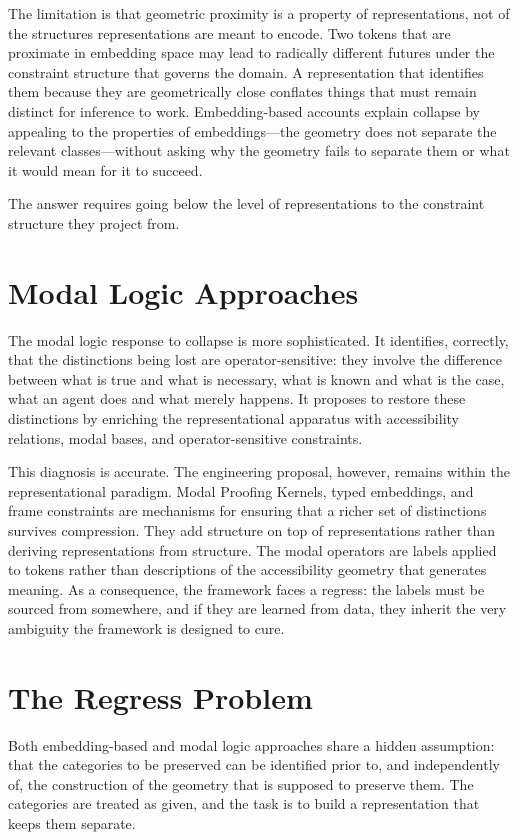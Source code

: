 \documentclass[12pt, oneside]{book}
\theoremstyle{plain-flyxion}
\theoremstyle{definition-flyxion}
\begin{document}
The limitation is that geometric proximity is a property of representations, not of the
structures representations are meant to encode. Two tokens that are proximate in
embedding space may lead to radically different futures under the constraint structure
that governs the domain. A representation that identifies them because they are
geometrically close conflates things that must remain distinct for inference to work.
Embedding-based accounts explain collapse by appealing to the properties of
embeddings---the geometry does not separate the relevant classes---without asking why the
geometry fails to separate them or what it would mean for it to succeed.

The answer requires going below the level of representations to the constraint structure
they project from.

\section{Modal Logic Approaches}

The modal logic response to collapse is more sophisticated. It identifies, correctly, that
the distinctions being lost are operator-sensitive: they involve the difference between
what is true and what is necessary, what is known and what is the case, what an agent
does and what merely happens. It proposes to restore these distinctions by enriching the
representational apparatus with accessibility relations, modal bases, and
operator-sensitive constraints.

This diagnosis is accurate. The engineering proposal, however, remains within the
representational paradigm. Modal Proofing Kernels, typed embeddings, and frame
constraints are mechanisms for ensuring that a richer set of distinctions survives
compression. They add structure on top of representations rather than deriving
representations from structure. The modal operators are labels applied to tokens rather
than descriptions of the accessibility geometry that generates meaning. As a consequence,
the framework faces a regress: the labels must be sourced from somewhere, and if they are
learned from data, they inherit the very ambiguity the framework is designed to cure.

\section{The Regress Problem}

Both embedding-based and modal logic approaches share a hidden assumption: that the
categories to be preserved can be identified prior to, and independently of, the
construction of the geometry that is supposed to preserve them. The categories are
treated as given, and the task is to build a representation that keeps them separate.
\end{document}
